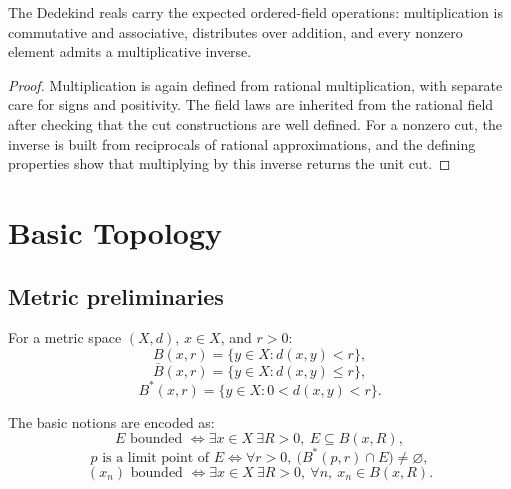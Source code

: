 \begin{theorem}
\label{thm:dedekind-multiplicative-structure}
The Dedekind reals carry the expected ordered-field operations: multiplication is
commutative and associative, distributes over addition, and every nonzero element admits a
multiplicative inverse.
\begin{proof}
Multiplication is again defined from rational multiplication, with separate care for signs and
positivity. The field laws are inherited from the rational field after checking that the cut
constructions are well defined. For a nonzero cut, the inverse is built from reciprocals of
rational approximations, and the defining properties show that multiplying by this inverse
returns the unit cut.
\end{proof}
\end{theorem}

\chapter{Basic Topology}

\section{Metric preliminaries}

\begin{definition}
\label{def:metric-balls}
For a metric space $(X,d)$, $x \in X$, and $r > 0$:
\[
B(x,r)=\{y\in X : d(x,y)<r\},
\]
\[
\overline{B}(x,r)=\{y\in X : d(x,y)\le r\},
\]
\[
B^\ast(x,r)=\{y\in X : 0<d(x,y)<r\}.
\]
\end{definition}

\begin{definition}
\label{def:bounded-limit-point}
The basic notions are encoded as:
\[
E \text{ bounded } \iff \exists x\in X\ \exists R>0,\ E \subseteq B(x,R),
\]
\[
p \text{ is a limit point of } E
\iff \forall r>0,\ \bigl(B^\ast(p,r)\cap E\bigr)\neq\varnothing,
\]
\[
(x_n) \text{ bounded } \iff \exists x\in X\ \exists R>0,\ \forall n,\ x_n \in B(x,R).
\]
\end{definition}

